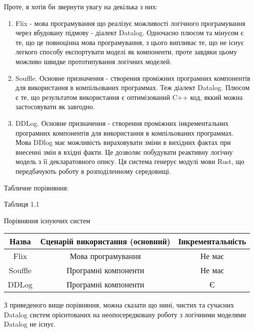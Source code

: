 Проте, я хотів би звернути увагу на декілька з них:

\begin{enumerate}

\item Flix -  мова програмування що реалізує можливості логічного програмування через вбудовану підмову - діалект Datalog. Одночасно плюсом та мінусом є те, що це повноцінна мова програмування, з цього випливає те, що не існує легкого способу експортувати моделі як компоненти, проте завдяки цьому можливо швидке прототипування логічних моделей.

\item Souffle. Основне призначення - створення проміжних програмних компонентів для використання в компільованих программах. Теж діалект Datalog. Плюсом є те, що результатом використання є оптимізований C++ код, яккий можна застосовувати як завгодно.

\item DDLog. Основне призначення - створення проміжних інкрементальних програмних компонентів для використання в компільованих программах. Мова DDlog має можливість вираховувати зміни в вихідних фактах при внесенні змін в вхідні факти. Це дозволяє побудувати реактивну логічну модель з її декларатовного опису. Ця система генерує модулі мови Rust, що передбачують роботу в розподіленному середовищі.

\end{enumerate}

Табличне порівняння: 

\begin{flushright}\small {Таблиця 1.1} \end{flushright}
\begin{center}
Порівняння існуючих систем
\small{
\begin{tabular}{ | c | c | c |  }
\hline
 Назва & Сценарій використання (основний)  & Інкрементальність \\ 
\hline
 Flix & Мова програмування & Не має \\  
\hline
 Souffle & Програмні компоненти & Не має \\  
\hline
 DDLog & Програмні компоненти & Є \\  
\hline
\end{tabular}
}
\end{center}


З приведеного вище порівняння, можна сказати що нині, чистих та сучасних Datalog систем орієнтованих на неопосередковану роботу з логічними моделями Datalog не існує.

